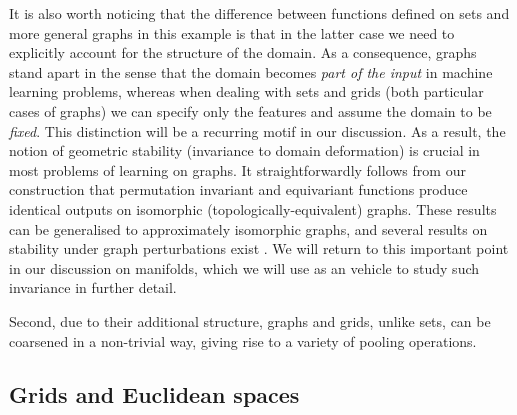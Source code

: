 

It is also worth noticing that the difference between functions defined on sets and more general graphs in this example is that in the latter case we need to explicitly account for the structure of the domain. 
%
As a consequence, graphs stand apart in the sense that the domain becomes {\em part of the input} in machine learning problems, whereas when dealing with sets and grids (both particular cases of graphs) we can specify only the features and assume the domain to be {\em fixed}. 
%
This distinction will be a recurring motif in our discussion. 
%
As a result, the notion of geometric stability (invariance to domain deformation) is crucial in most problems of learning on graphs. It straightforwardly follows from our construction that permutation invariant and equivariant functions produce identical outputs on isomorphic (topologically-equivalent) graphs. These results can be generalised to approximately isomorphic graphs, and several results on stability under graph perturbations exist  \citep{levie2018cayleynets}.  We will return to this important point in our discussion on manifolds, which we will use as an vehicle to study such invariance in further detail. 


Second, due to their additional structure, graphs and grids, unlike sets, can be coarsened in a non-trivial way, giving rise to a variety of pooling operations. 
%



\subsection{Grids and Euclidean spaces} 
\label{sec:grids_euclidean}


